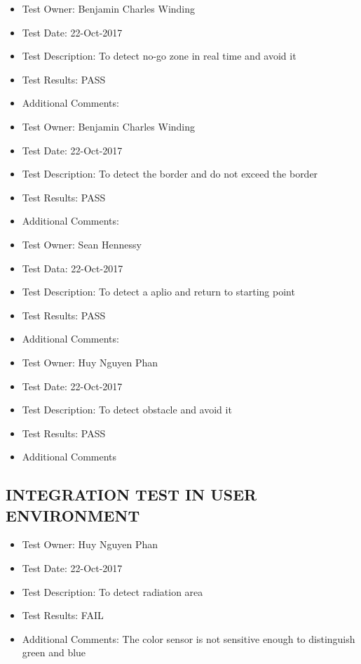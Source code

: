 \documentclass[10pt,a4paper,titlepage]{article}
\begin{document}
\begin{itemize}
\item Test Owner: Benjamin Charles Winding
\item Test Date: 22-Oct-2017
\item Test Description: To detect no-go zone in real time and avoid it
\item Test Results: PASS
\item Additional Comments:

\end{itemize}

\begin{itemize}
\item Test Owner: Benjamin Charles Winding
\item Test Date: 22-Oct-2017
\item Test Description: To detect the border and do not exceed the border
\item Test Results: PASS
\item Additional Comments:
\end{itemize}		
	

\begin{itemize}
\item Test Owner: Sean Hennessy
\item Test Data: 22-Oct-2017
\item Test Description: To detect a aplio and return to starting point
\item Test Results: PASS 
\item Additional Comments: 

\end{itemize}

\begin{itemize}
\item Test Owner:  Huy Nguyen Phan
\item Test Date: 22-Oct-2017
\item Test Description: To detect obstacle and avoid it 
\item Test Results: PASS
\item Additional Comments	
\end{itemize}

\subsection{INTEGRATION TEST IN USER ENVIRONMENT}

\begin{itemize}
	\item Test Owner:  Huy Nguyen Phan
	\item Test Date: 22-Oct-2017
	\item Test Description: To detect radiation area 
	\item Test Results: FAIL
	\item Additional Comments: The color sensor is not sensitive enough to distinguish green and blue
	
\end{itemize}
\end{document}
